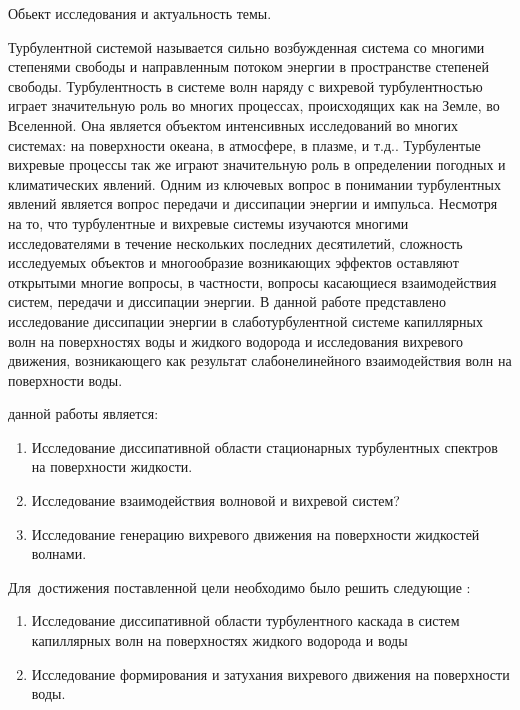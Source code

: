 
{\actuality}Обьект исследования и актуальность темы.

Турбулентной системой называется сильно возбужденная система со многими степенями свободы и направленным потоком энергии в пространстве степеней свободы. Турбулентность в системе волн наряду с вихревой турбулентностью играет значительную роль во многих процессах, происходящих как на Земле, во Вселенной. Она является объектом  интенсивных исследований во многих системах: на поверхности океана, в атмосфере, в плазме, и т.д.. Турбулентые вихревые процессы так же играют значительную роль в определении погодных и климатических явлений. Одним из ключевых вопрос в понимании турбулентных явлений является вопрос передачи и диссипации энергии и импульса. 
Несмотря на то, что турбулентные и вихревые системы изучаются многими исследователями в течение нескольких последних десятилетий, сложность исследуемых объектов и многообразие возникающих эффектов оставляют открытыми многие вопросы, в частности, вопросы касающиеся взаимодействия систем, передачи и диссипации энергии. 
В данной работе представлено исследование диссипации энергии в слаботурбулентной системе капиллярных волн на поверхностях воды и жидкого водорода и исследования вихревого движения, возникающего как результат слабонелинейного взаимодействия волн на поверхности воды.

{\aim} данной работы является: 
\begin{enumerate}
	\item Исследование диссипативной области стационарных турбулентных спектров на поверхности жидкости.
	\item Исследование взаимодействия волновой и вихревой систем?
	\item Исследование генерацию вихревого движения на поверхности жидкостей волнами.
\end{enumerate}

Для~достижения поставленной цели необходимо было решить следующие {\tasks}:
\begin{enumerate}
	\item Исследование диссипативной области турбулентного каскада в систем капиллярных волн на поверхностях жидкого водорода и воды
	\item Исследование формирования и затухания вихревого движения на поверхности воды.
\end{enumerate}

